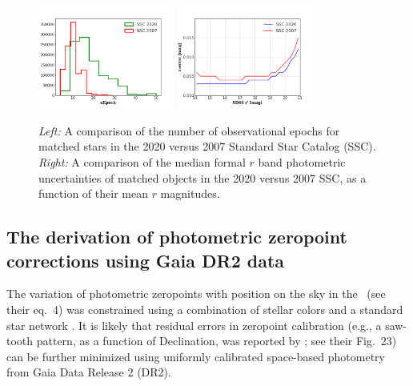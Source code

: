 \begin{figure}[th!]
\centering
\includegraphics[width=0.4\textwidth, keepaspectratio]{figures/nepoch_compOvsN.png}
\includegraphics[width=0.4\textwidth, keepaspectratio]{figures/rerr_compOvsN.png}
\caption{{\it Left:} A comparison of the number of observational epochs for matched stars in the 2020 versus 2007 Standard Star Catalog (SSC). {\it Right:} A comparison of the median formal $r$ band photometric uncertainties of matched objects in the 2020 versus 2007 SSC, as a function of their mean $r$ magnitudes.
\label{fig:rerr_nvso}}
\end{figure}


\subsection{The derivation of  photometric zeropoint corrections using Gaia DR2 data\label{sec:GaiaCorr}} 

The variation of photometric zeropoints with position on the sky in the \pOc\ (see their eq.~4) was 
constrained using a combination of stellar colors \citep[the principal axes in color-color diagrams, for details 
see][]{2004AN....325..583I} and a standard star network \citep{2002AJ....123.2121S}. It is likely that 
residual errors in zeropoint calibration (e.g., a saw-tooth pattern, as a function of Declination,
was reported by \citealt{2013A&A...552A.124B}; see their Fig.~23) can be further minimized using 
uniformly calibrated space-based photometry from Gaia Data Release 2 (DR2). 

